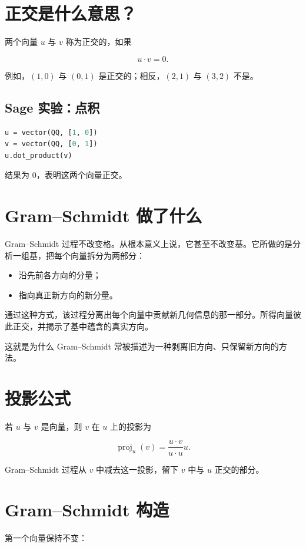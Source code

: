 \section{正交是什么意思？}
两个向量 $u$ 与 $v$ 称为正交的，如果

\[
u \cdot v = 0.
\]

例如，$(1,0)$ 与 $(0,1)$ 是正交的；相反，$(2,1)$ 与 $(3,2)$ 不是。

\subsection{Sage 实验：点积}

\begin{lstlisting}[language=Python]
u = vector(QQ, [1, 0])
v = vector(QQ, [0, 1])
u.dot_product(v)
\end{lstlisting}

结果为 $0$，表明这两个向量正交。

\section{Gram--Schmidt 做了什么}
Gram--Schmidt 过程不改变格。从根本意义上说，它甚至不改变基。它所做的是分析一组基，把每个向量拆分为两部分：

\begin{itemize}
  \item 沿先前各方向的分量；
  \item 指向真正新方向的新分量。
\end{itemize}

通过这种方式，该过程分离出每个向量中贡献新几何信息的那一部分。所得向量彼此正交，并揭示了基中蕴含的真实方向。

这就是为什么 Gram--Schmidt 常被描述为一种剥离旧方向、只保留新方向的方法。

\section{投影公式}
若 $u$ 与 $v$ 是向量，则 $v$ 在 $u$ 上的投影为

\[
\operatorname{proj}_u(v)=\frac{u\cdot v}{u\cdot u}u.
\]

Gram--Schmidt 过程从 $v$ 中减去这一投影，留下 $v$ 中与 $u$ 正交的部分。

\section{Gram--Schmidt 构造}
第一个向量保持不变：

